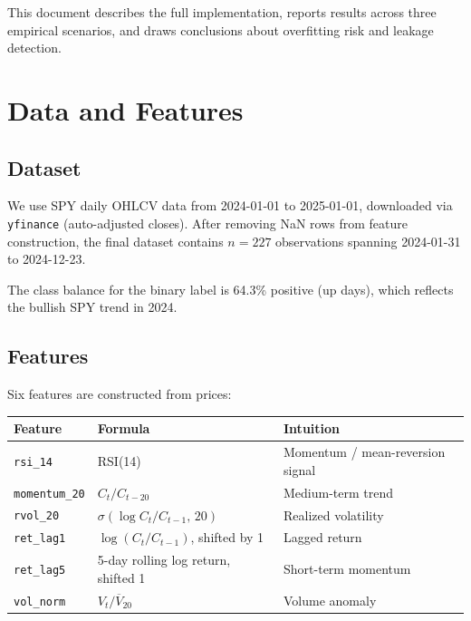 \documentclass[11pt,a4paper]{article}
\begin{document}
This document describes the full implementation, reports results across three
empirical scenarios, and draws conclusions about overfitting risk and leakage
detection.

\section{Data and Features}

\subsection{Dataset}

We use SPY daily OHLCV data from 2024-01-01 to 2025-01-01, downloaded via
\texttt{yfinance} (auto-adjusted closes).  After removing NaN rows from feature
construction, the final dataset contains $n = 227$ observations spanning
2024-01-31 to 2024-12-23.

The class balance for the binary label is 64.3\% positive (up days), which
reflects the bullish SPY trend in 2024.

\subsection{Features}

Six features are constructed from prices:

\begin{center}
\begin{tabular}{lll}
\toprule
Feature & Formula & Intuition \\
\midrule
\texttt{rsi\_14}     & RSI(14)                              & Momentum / mean-reversion signal \\
\texttt{momentum\_20}& $C_t / C_{t-20}$                     & Medium-term trend \\
\texttt{rvol\_20}    & $\sigma(\log C_t/C_{t-1},\,20)$     & Realized volatility \\
\texttt{ret\_lag1}   & $\log(C_t/C_{t-1})$, shifted by 1   & Lagged return \\
\texttt{ret\_lag5}   & 5-day rolling log return, shifted 1  & Short-term momentum \\
\texttt{vol\_norm}   & $V_t / \overline{V}_{20}$            & Volume anomaly \\
\bottomrule
\end{tabular}
\end{center}
\end{document}
